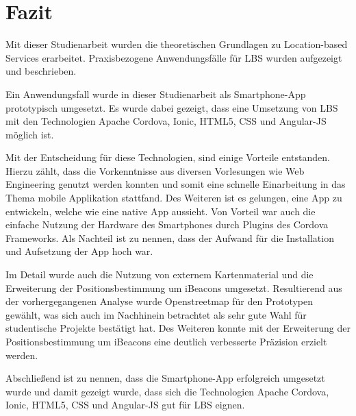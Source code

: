 \newpage
\section{Fazit}


Mit dieser Studienarbeit wurden die theoretischen Grundlagen zu Location-based Services erarbeitet. 
Praxisbezogene Anwendungsfälle für LBS wurden aufgezeigt und beschrieben.

Ein Anwendungsfall wurde in dieser Studienarbeit als Smartphone-App prototypisch umgesetzt. 
Es wurde dabei gezeigt, dass eine Umsetzung von LBS mit den Technologien Apache Cordova, Ionic, HTML5, CSS und Angular-JS möglich ist. 

Mit der Entscheidung für diese Technologien, sind einige Vorteile entstanden. Hierzu zählt, dass die Vorkenntnisse aus diversen Vorlesungen wie Web Engineering genutzt werden konnten und somit eine schnelle Einarbeitung in das Thema mobile Applikation stattfand. Des Weiteren ist es gelungen, eine App zu entwickeln, welche wie eine native App aussieht. Von Vorteil war auch die einfache Nutzung der Hardware des Smartphones durch Plugins des Cordova Frameworks. Als Nachteil ist zu nennen, dass der Aufwand für die Installation und Aufsetzung der App hoch war.

Im Detail wurde auch die Nutzung von externem Kartenmaterial und die Erweiterung der Positionsbestimmung um iBeacons umgesetzt.
Resultierend aus der vorhergegangenen Analyse wurde Openstreetmap für den Prototypen gewählt, was sich auch im Nachhinein betrachtet als sehr gute Wahl für studentische Projekte bestätigt hat. Des Weiteren konnte mit der Erweiterung der Positionsbestimmung um iBeacons eine deutlich verbesserte Präzision erzielt werden. 

Abschließend ist zu nennen, dass die Smartphone-App erfolgreich umgesetzt wurde und damit gezeigt wurde, dass sich die Technologien Apache Cordova, Ionic, HTML5, CSS und Angular-JS gut für LBS eignen.


